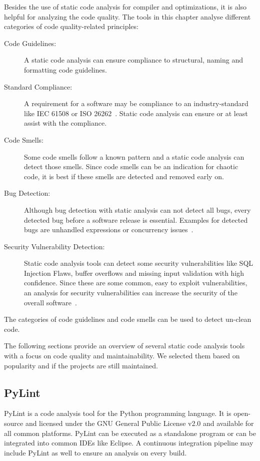 Besides the use of static code analysis for compiler and optimizations, it is also helpful for analyzing the code quality. The tools in this chapter analyse different categories of code quality-related principles:
\begin{description}
    \item[Code Guidelines:] A static code analysis can ensure compliance to structural, naming and formatting code guidelines. 
    \item[Standard Compliance:] A requirement for a software may be compliance to an industry-standard like IEC 61508 or ISO 26262~\cite{tc_65sc_65a_iec_2010,isotc_22sc_32_iso_2018}. Static code analysis can ensure or at least assist with the compliance.  
    \item[Code Smells:] Some code smells follow a known pattern and a static code analysis can detect those smells. Since code smells can be an indication for chaotic code, it is best if these smells are detected and removed early on.
    \item[Bug Detection:] Although bug detection with static analysis can not detect all bugs, every detected bug before a software release is essential. Examples for detected bugs are unhandled expressions or concurrency issues~\cite{delaitre_evaluating_2015}.
    \item[Security Vulnerability Detection:] Static code analysis tools can detect some security vulnerabilities like SQL Injection Flaws, buffer overflows and missing input validation with high confidence. Since these are some common, easy to exploit vulnerabilities, an analysis for security vulnerabilities can increase the security of the overall software~\cite{wichers_source_nodate}.  
\end{description}

The categories of code guidelines and code smells can be used to detect un-clean code.

The following sections provide an overview of several static code analysis tools with a focus on code quality and maintainability. We selected them based on popularity and if the projects are still maintained.

\subsection{PyLint}
PyLint is a code analysis tool for the Python programming language. It is open-source and licensed under the GNU General Public License v2.0 and available for all common platforms. PyLint can be executed as a standalone program or can be integrated into common IDEs like Eclipse. A continuous integration pipeline may include PyLint as well to ensure an analysis on every build.

